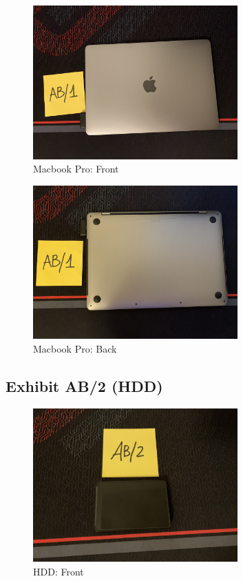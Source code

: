 \begin{figure}[h]
  \centering
  \includegraphics[width=0.7\textwidth]{figures/pictures/IMG_5042.JPG}
  \caption{Macbook Pro: Front}
  \label{fig:macbook-front}
\end{figure}

\begin{figure}[h]
  \centering
  \includegraphics[width=0.7\textwidth]{figures/pictures/IMG_5043.JPG}
  \caption{Macbook Pro: Back}
  \label{fig:macbook-back}
\end{figure}
\newpage

\subsection{Exhibit AB/2 (HDD)}
\label{s:ab2}

\begin{figure}[h]
  \centering
  \includegraphics[width=0.7\textwidth]{figures/pictures/IMG_5044.JPG}
  \caption{HDD: Front}
  \label{fig:hdd-front}
\end{figure}

